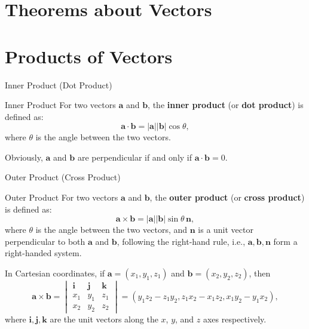 \documentclass[11pt]{../../TexTemplate/elegantbook} %
\begin{document}
\section{Theorems about Vectors}

\section{Products of Vectors} %
\begin{leftbarTitle}{Inner Product (Dot Product)}\end{leftbarTitle} %
\begin{definition}{Inner Product}
    For two vectors \(\mathbf{a}\) and \(\mathbf{b}\), the \textbf{inner product} (or \textbf{dot product}) is defined as:
    \[
    \mathbf{a} \cdot \mathbf{b} = |\mathbf{a}| |\mathbf{b}| \cos \theta,
    \]
    where \(\theta\) is the angle between the two vectors.
\end{definition}
Obviously, \(\mathbf{a}\) and \(\mathbf{b}\) are perpendicular if and only if \(\mathbf{a} \cdot \mathbf{b} = 0\).

\begin{leftbarTitle}{Outer Product (Cross Product)}\end{leftbarTitle} %
\begin{definition}{Outer Product}
    For two vectors \(\mathbf{a}\) and \(\mathbf{b}\), the \textbf{outer product} (or \textbf{cross product}) is defined as:
    \[
    \mathbf{a} \times \mathbf{b} = |\mathbf{a}| |\mathbf{b}| \sin \theta \, \mathbf{n},
    \]
    where \(\theta\) is the angle between the two vectors, and \(\mathbf{n}\) is a unit vector perpendicular 
    to both \(\mathbf{a}\) and \(\mathbf{b}\),
    following the right-hand rule, i.e., \(\mathbf{a}, \mathbf{b}, \mathbf{n}\) form a right-handed system.
\end{definition}

In Cartesian coordinates, if \(\mathbf{a} = (x_{1}, y_{1}, z_{1})\) and \(\mathbf{b} = (x_{2}, y_{2}, z_{2})\),
then
\[
\mathbf{a} \times \mathbf{b} =
\begin{vmatrix}
\mathbf{i} & \mathbf{j} & \mathbf{k} \\
x_{1} & y_{1} & z_{1} \\
x_{2} & y_{2} & z_{2}
\end{vmatrix} =
(y_{1}z_{2} - z_{1}y_{2}, z_{1}x_{2} - x_{1}z_{2}, x_{1}y_{2} - y_{1}x_{2}),
\]
where \(\mathbf{i}, \mathbf{j}, \mathbf{k}\) are the unit vectors along the \(x\), \(y\), and \(z\) axes respectively.
\end{document}
